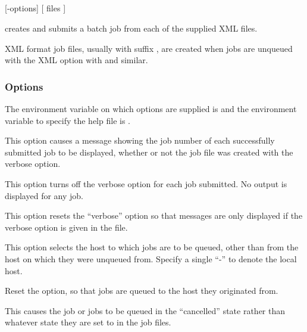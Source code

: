 \subsection{\BtsName}

\begin{expara}

\BtsName{} [-options] [ files ]

\end{expara}

\PrBts{} creates and submits a \ProductName{} batch job from each of the supplied XML files.

XML format job files, usually with suffix \batchjobsuffix, are created when jobs are unqueued with the XML option with \PrBtq{} and similar.

\subsubsection{Options}
The environment variable on which options are supplied is \filename{\BtsVarname} and the environment variable to specify the help file is
.
\explainopt


This option causes a message showing the job number of each successfully submitted job to be displayed, whether or not the job file
was created with the verbose option.


This option turns off the verbose option for each job submitted. No output is displayed for any job.


This option resets the ``verbose'' option so that messages are only displayed if the verbose option is given in the file.


This option selects the host to which jobs are to be queued, other than from the host on which they were unqueued from. Specify a single ``-'' to
denote the local host.


Reset the  option, so that jobs are queued to the host they originated from.


This causes the job or jobs to be queued in the ``cancelled'' state rather than whatever state they are set to in the job files.

